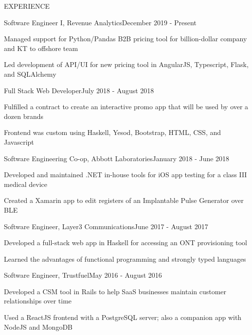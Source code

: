 \documentclass{resume} %
\begin{document}
\begin{rSection}{EXPERIENCE}

  \begin{rSubsection}{Software Engineer I, Revenue Analytics}{December 2019 - Present}{}{}
  \item Managed support for Python/Pandas B2B pricing tool for billion-dollar company and KT to offshore team
  \item Led development of API/UI for new pricing tool in AngularJS, Typescript, Flask, and SQLAlchemy
  \end{rSubsection} 


  \begin{rSubsection}{Full Stack Web Developer}{July 2018 - August 2018}{}{}
  \item Fulfilled a contract to create an interactive promo app that will be used by over a dozen brands
  \item Frontend was custom using Haskell, Yesod, Bootstrap, HTML, CSS, and Javascript
  \end{rSubsection} 


  \begin{rSubsection}{Software Engineering Co-op, Abbott Laboratories}{January 2018 - June 2018}{}{}
  \item Developed and maintained .NET in-house tools for iOS app testing for a class III medical device
  \item Created a Xamarin app to edit registers of an Implantable Pulse Generator over BLE
  \end{rSubsection} 


  \begin{rSubsection}{Software Engineer, Layer3 Communications}{June 2017 - August 2017}{}{}
  \item Developed a full-stack web app in Haskell for accessing an ONT provisioning tool
  \item Learned the advantages of functional programming and strongly typed languages
  \end{rSubsection} 


  \begin{rSubsection}{Software Engineer, Trustfuel}{May 2016 - August 2016}{}{}
  \item Developed a CSM tool in Rails to help SaaS businesses maintain customer relationships over time
  \item Used a ReactJS frontend with a PostgreSQL server; also a companion app with NodeJS and MongoDB
  \end{rSubsection} 

\end{rSection}
\end{document}
